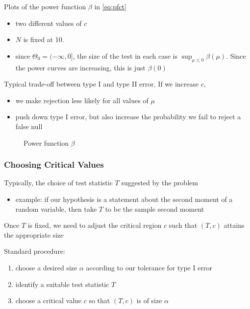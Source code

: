 \begin{frame}

    \vspace{2em}
    Plots of the power function $\beta$ in \eqref{eq:pfct} 
    \begin{itemize}
        \item two different values of $c$
        \item $N$ is fixed at 10.
        \item  since $\Theta_0 = (-\infty, 0]$, the size of the test in each case is
                $\sup_{\mu \leq 0} \beta(\mu)$. Since the power curves are increasing,
                this is just $\beta(0)$
    \end{itemize}
    
    Typical trade-off between type I and type
    II error. If we increase $c$,
    \begin{itemize}
        \item  we make rejection less likely for all values of
                $\mu$
        \item push down type I error, but also increase the probability
            we fail to reject a false null
    \end{itemize} 

\end{frame}

\begin{frame}

    \begin{figure}
   \begin{center}
    \caption{\label{f:power} Power function $\beta$}
   \end{center}
    \end{figure}
    
\end{frame}

\begin{frame}\frametitle{Choosing Critical Values}
 
    \vspace{2em}
    Typically, the
    choice of test statistic $T$ suggested by the problem
    \begin{itemize}
        \item example: if our hypothesis is
        a statement about the second moment of a random variable, then take
        $T$ to be the sample second moment
    \end{itemize}
    
    Once $T$ is fixed, we need to adjust the critical region $c$
    such that $(T,c)$ attains the appropriate size
    
    Standard procedure:
    \begin{enumerate}
        \item choose a desired size $\alpha$ according to our tolerance for
        type I error
        \item identify a suitable test statistic $T$
        \item choose a critical value $c$ so that $(T,c)$ is of size $\alpha$
    \end{enumerate}
    
\end{frame}

